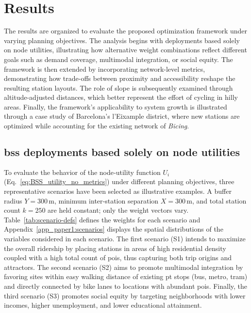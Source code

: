 \section{Results}
\label{sec:station_planning_results}

The results are organized to evaluate the proposed optimization framework under varying planning objectives. The analysis begins with deployments based solely on node utilities, illustrating how alternative weight combinations reflect different goals such as demand coverage, multimodal integration, or social equity. The framework is then extended by incorporating network-level metrics, demonstrating how trade-offs between proximity and accessibility reshape the resulting station layouts. The role of slope is subsequently examined through altitude-adjusted distances, which better represent the effort of cycling in hilly areas. Finally, the framework’s applicability to system growth is illustrated through a case study of Barcelona’s l'Eixample district, where new stations are optimized while accounting for the existing network of \textit{Bicing}.

    \subsection[BSS deployments based solely on node utilities]{\ac{bss} deployments based solely on node utilities}

    To evaluate the behavior of the node‐utility function \(U_{i}\) (Eq.~\ref{eq:BSS_utility_no_metrics}) under different planning objectives, three representative scenarios have been selected as illustrative examples. A buffer radius \(Y = 300\,\mathrm{m}\), minimum inter‐station separation \(X = 300\,\mathrm{m}\), and total station count \(k = 250\) are held constant; only the weight vectors vary. Table~\ref{tab:scenario-defs} defines the weights for each scenario and Appendix~\ref{app_paper1:scenarios} displays the spatial distributions of the variables considered in each scenario. The first scenario (S1) intends to maximize the overall ridership by placing stations in areas of high residential density coupled with a high total count of \acp{poi}, thus capturing both trip origins and attractors. The second scenario (S2) aims to promote multimodal integration by favoring sites within easy walking distance of existing \ac{pt} stops (bus, metro, tram) and directly connected by bike lanes to locations with abundant \acp{poi}. Finally, the third scenario (S3) promotes social equity by targeting neighborhoods with lower incomes, higher unemployment, and lower educational attainment.

